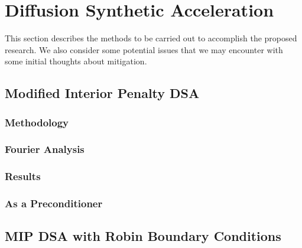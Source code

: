 \documentclass[12pt]{article}
\begin{document}
\section{Diffusion Synthetic Acceleration}
\label{sec:DSA}

This section describes the methods to be carried out to accomplish the proposed research. We also consider some potential issues that we may encounter with some initial thoughts about mitigation. 

\subsection{Modified Interior Penalty DSA}

\subsubsection{Methodology}
\subsubsection{Fourier Analysis}
\subsubsection{Results}
\subsubsection{As a Preconditioner}

\subsection{MIP DSA with Robin Boundary Conditions}
\end{document}
